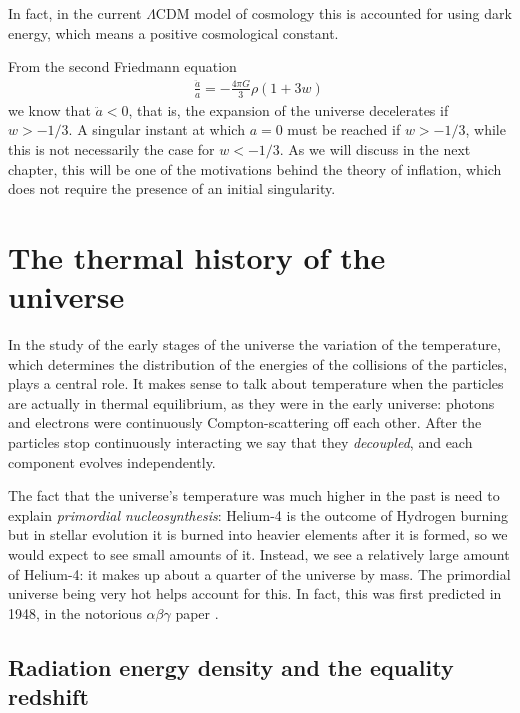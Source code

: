 \documentclass[main.tex]{subfiles}
\begin{document}
In fact, in the current \(\Lambda \)CDM model of cosmology this is accounted for using dark energy, which means a positive cosmological constant.

From the second Friedmann equation 
%
\begin{align}
\frac{\ddot{a}}{a} =- \frac{4 \pi G}{3} \rho (1+3w) 
\,
\end{align}
%
we know that \(\ddot{a} < 0\), that is, the expansion of the universe decelerates if \(w > - 1/3\).
A singular instant at which \(a =0\) must be reached if \(w>-1/3\), while this is not necessarily the case for \(w<-1/3\).
As we will discuss in the next chapter, this will be one of the motivations behind the theory of inflation, which does not require the presence of an initial singularity. 


\chapter{The thermal history of the universe}

In the study of the early stages of the universe the variation of the temperature, which determines the distribution of the energies of the collisions of the particles, plays a central role.
It makes sense to talk about temperature when the particles are actually in thermal equilibrium, as they were in the early universe: photons and electrons were continuously Compton-scattering off each other. 
After the particles stop continuously interacting we say that they \emph{decoupled}, and each component evolves independently. 

The fact that the universe's temperature was much higher in the past is need to explain \emph{primordial nucleosynthesis}: Helium-4 is the outcome of Hydrogen burning but in stellar evolution it is burned into heavier elements after it is formed, so we would expect to see small amounts of it. 
Instead, we see a relatively large amount of Helium-4: it makes up about a quarter of the universe by mass. 
The primordial universe being very hot helps account for this. 
In fact, this was first predicted in 1948, in the notorious \(\alpha \beta \gamma \) paper \cite[]{alpherOriginChemicalElements1948}. 

\section{Radiation energy density and the equality redshift}
\end{document}
